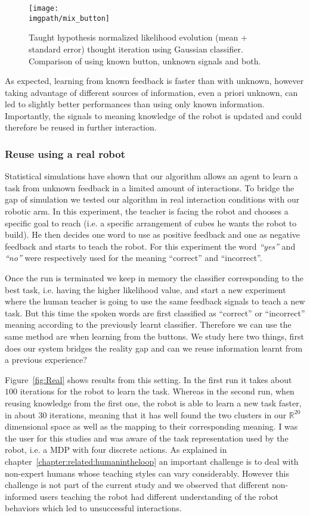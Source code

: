 \begin{figure}[!ht]
  \centering
  \texttt{[image: \\imgpath/mix\_button]}
  \caption{Taught hypothesis normalized likelihood evolution (mean + standard error) thought iteration using Gaussian classifier. Comparison of using known button, unknown signals and both.}
  \label{fig:button}
\end{figure}

As expected, learning from known feedback is faster than with unknown, however taking advantage of different sources of information, even a priori unknown, can led to slightly better performances than using only known information. Importantly, the signals to meaning knowledge of the robot is updated and could therefore be reused in further interaction.

\subsubsection{Reuse using a real robot}

Statistical simulations have shown that our algorithm allows an agent to learn a task from unknown feedback in a limited amount of interactions. To bridge the gap of simulation we tested our algorithm in real interaction conditions with our robotic arm. In this experiment, the teacher is facing the robot and chooses a specific goal to reach (i.e. a specific arrangement of cubes he wants the robot to build). He then decides one word to use as positive feedback and one as negative feedback and starts to teach the robot. For this experiment the word \textit{``yes''} and \textit{``no''} were respectively used for the meaning ``correct'' and ``incorrect''. 

Once the run is terminated we keep in memory the classifier corresponding to the best task, i.e. having the higher likelihood value, and start a new experiment where the human teacher is going to use the same feedback signals to teach a new task. But this time the spoken words are first classified as ``correct'' or ``incorrect'' meaning according to the previously learnt classifier. Therefore we can use the same method are when learning from the buttons. We study here two things, first does our system bridges the reality gap and can we reuse information learnt from a previous experience? 

Figure~\ref{fig:Real} shows results from this setting. In the first run it takes about $100$ iterations for the robot to learn the task. Whereas in the second run, when reusing knowledge from the first one, the robot is able to learn a new task faster, in about $30$ iterations, meaning that it has well found the two clusters in our $\mathbb{R}^{20}$ dimensional space as well as the mapping to their corresponding meaning. I was the user for this studies and was aware of the task representation used by the robot, i.e. a MDP with four discrete actions. As explained in chapter~\ref{chapter:related:humanintheloop} an important challenge is to deal with non-expert humans whose teaching styles can vary considerably. However this challenge is not part of the current study and we observed that different non-informed users teaching the robot had different understanding of the robot behaviors which led to unsuccessful interactions.

